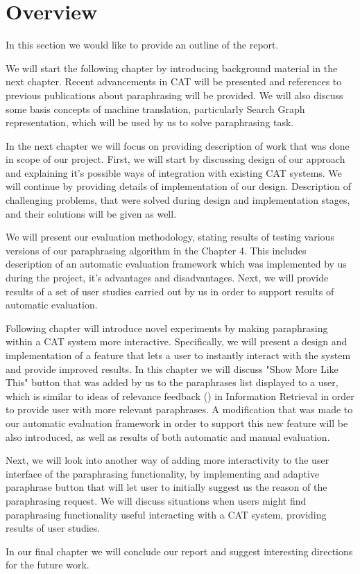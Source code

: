 \section{Overview}

In this section we would like to provide an outline of the report. 

We will start the following chapter by introducing background material in the next chapter. Recent advancements in CAT will be presented and references to previous publications about paraphrasing will be provided. We will also discuss some basis concepts of machine translation, particularly Search Graph representation, which will be used by us to solve paraphrasing task. 

In the next chapter we will focus on providing description of work that was done in scope of our project. First, we will start by discussing design of our approach and explaining it's possible ways of integration with existing CAT systems. We will continue by providing details of implementation of our design. Description of challenging problems, that were solved during design and implementation stages,  and their solutions will be given as well.

We will present our evaluation methodology, stating results of testing various versions of our paraphrasing algorithm in the Chapter 4.  This includes description of an automatic evaluation framework which was implemented by us during the project, it's advantages and disadvantages. 
Next, we will provide results of a set of user studies carried out by us in order to support results of automatic evaluation. 

Following chapter will introduce novel experiments by making paraphrasing within a CAT system more interactive. Specifically, we will present a design and implementation of a feature that lets a user to instantly interact with  the system and provide improved results. In this chapter we will discuss "Show More Like This" button that was added by us to the paraphrases list displayed to a user, which is similar to ideas of relevance feedback () in Information Retrieval in order to provide user with more relevant paraphrases. A modification that was made to our automatic evaluation framework in order to support this new feature will be also introduced, as well as results of both  automatic and manual evaluation.  

Next, we will look into another way of adding more interactivity to the user interface of the paraphrasing functionality, by implementing and adaptive paraphrase button that will let user to initially suggest us the reason of the paraphrasing request. We will discuss situations when users might find paraphrasing functionality useful interacting with a CAT system, providing results of user studies.

In our final chapter we will conclude our report and suggest interesting directions for the future work. 



